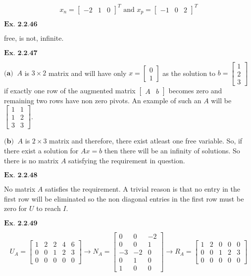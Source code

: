 \documentclass{article}
\begin{document}
$$
x_n = \begin{bmatrix}-2&1&0\end{bmatrix}^T \text{ and } x_p = \begin{bmatrix}-1&0&2\end{bmatrix}^T
$$

\vspace{0.2in}
${\textbf{Ex. 2.2.46}}$

free, is not, infinite.

\vspace{0.2in}
${\textbf{Ex. 2.2.47}}$

$\textbf{(a)} \ $ $A$ is $3\times 2$ matrix and will have only $x = \begin{bmatrix}0\\1\end{bmatrix}$ as the solution to $b = \begin{bmatrix}1\\2\\3\end{bmatrix}$ if exactly one row of the augmented matrix $\begin{bmatrix}A&b\end{bmatrix}$ becomes zero and remaining two rows have non zero pivots. An example of such an $A$ will be $\begin{bmatrix}1&1\\1&2\\3&3\end{bmatrix}$.

$\textbf{(b)} \ $ $A$ is $2\times 3$ matrix and therefore, there exist atleast one free variable. So, if there exist a solution for $Ax=b$ then there will be an infinity of solutions. So there is no matrix $A$ satisfying the requirement in question.

\vspace{0.2in}
${\textbf{Ex. 2.2.48}}$

No matrix $A$ satisfies the requirement. A trivial reason is that no entry in the first row will be eliminated so the non diagonal entries in the first row must be zero for $U$ to reach $I$.

\vspace{0.2in}
${\textbf{Ex. 2.2.49}}$

$$
U_A = \begin{bmatrix}1&2&2&4&6\\0&0&1&2&3\\0&0&0&0&0\end{bmatrix} \rightarrow N_A = \begin{bmatrix}0&0&-2\\0&0&1\\-3&-2&0\\0&1&0\\1&0&0\end{bmatrix} \rightarrow R_A = \begin{bmatrix}1&2&0&0&0\\0&0&1&2&3\\0&0&0&0&0\end{bmatrix}
$$
\end{document}
